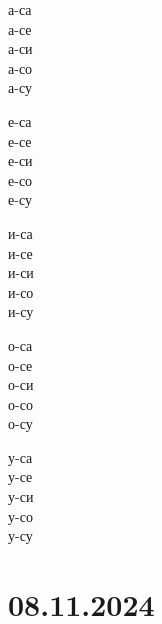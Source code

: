\documentclass[a5paper,12pt]{article}
\begin{document}
\vspace{1cm}

\noindent 
\begin{minipage}[t]{0.19\textwidth}
  а-са\\
  а-се\\
  а-си\\
  а-со\\
  а-су
\end{minipage}
\hfill 
\begin{minipage}[t]{0.19\textwidth}
  е-са\\
  е-се\\
  е-си\\
  е-со\\
  е-су
\end{minipage}
\hfill %
\begin{minipage}[t]{0.19\textwidth}
  и-са\\
  и-се\\
  и-си\\
  и-со\\
  и-су
\end{minipage}
\hfill %
\begin{minipage}[t]{0.19\textwidth}
  о-са\\
  о-се\\
  о-си\\
  о-со\\
  о-су
\end{minipage}
\hfill %
\begin{minipage}[t]{0.19\textwidth}
  у-са\\
  у-се\\
  у-си\\
  у-со\\
  у-су
\end{minipage}

\section{08.11.2024}
\end{document}
